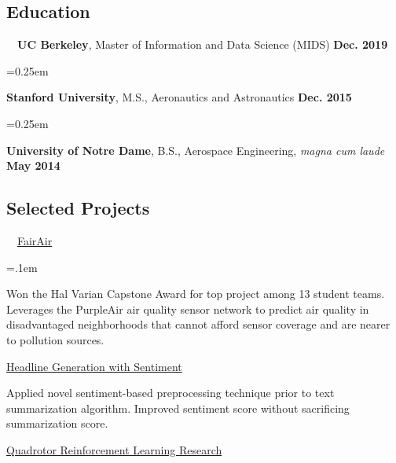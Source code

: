 \documentclass[10pt,letterpaper]{article}
\begin{document}
\begin{paracol}{2}
\setlength{\columnsep}{2em}

\begin{leftcolumn}

\subsection*{Education}

    \quad \ \ \textbf{UC Berkeley}, Master of Information and Data Science (MIDS) \textbf{\hfill Dec. 2019}

    \parskip=0.25em

    \textbf{Stanford University}, M.S., Aeronautics and Astronautics \textbf{\hfill Dec. 2015}

    \parskip=0.25em

    \textbf{University of Notre Dame}, B.S., Aerospace Engineering, \emph{magna cum laude} \textbf{\hfill May 2014}

\subsection*{Selected Projects}

    \quad \ \ \href{https://www.ischool.berkeley.edu/projects/2019/fairair-filling-gaps-air-pollution-monitoring}{FairAir}

    \parskip=.1em

        \begin{adjustwidth}{2.5em}{}
        Won the Hal Varian Capstone Award for top project among 13 student teams. Leverages the PurpleAir air quality sensor network to predict air quality in disadvantaged neighborhoods that cannot afford sensor coverage and are nearer to pollution sources.
        \end{adjustwidth}

    \href{https://github.com/mpaluta/headline_generation/blob/master/Headline_Generation_Arnoldy_Paluta.pdf}{Headline Generation with Sentiment}

        \begin{adjustwidth}{2.5em}{}
        Applied novel sentiment-based preprocessing technique prior to text summarization algorithm. Improved sentiment score without sacrificing summarization score.
        \end{adjustwidth}

    \href{https://github.com/mpaluta/Quadrotor-PILCO/blob/QuadrotorPILCO/Quadrotor\%20Reinforcement\%20Learning\%20Research.pdf}{Quadrotor Reinforcement Learning Research}


\end{leftcolumn}
\end{paracol}
\end{document}
